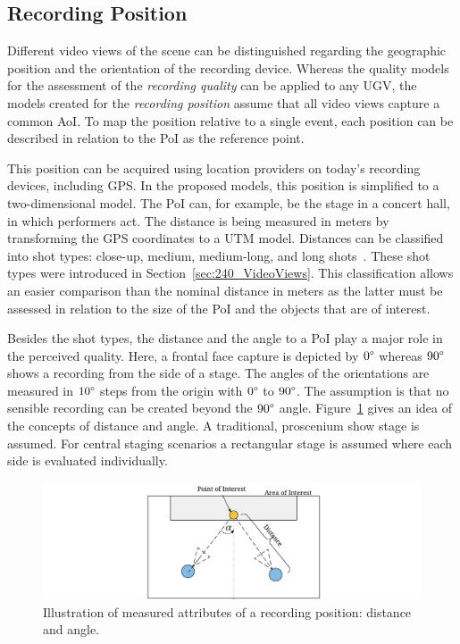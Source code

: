 \subsection{Recording Position}
Different video views of the scene can be distinguished regarding the geographic position and the orientation of the recording device.
Whereas the quality models for the assessment of the \emph{recording quality} can be applied to any \ac{UGV}, the models created for the \emph{recording position} assume that all video views capture a common \ac{AoI}. 
To map the position relative to a single event, each position can be described in relation to the \ac{PoI} as the reference point.

This position can be acquired using location providers on today's recording devices, including \ac{GPS}.
In the proposed models, this position is simplified to a two-dimensional model.
The \ac{PoI} can, for example, be the stage in a concert hall, in which performers act.
The distance is being measured in meters by transforming the \ac{GPS} coordinates to a \ac{UTM} model.
Distances can be classified into shot types: close-up, medium, medium-long, and long shots~\cite{Bowen2013}.
These shot types were introduced in Section~\ref{sec:240_VideoViews}.
This classification allows an easier comparison than the nominal distance in meters as the latter must be assessed in relation to the size of the \ac{PoI} and the objects that are of interest.

Besides the shot types, the distance and the angle to a \ac{PoI} play a major role in the perceived quality.
Here, a frontal face capture is depicted by $0\degree$ whereas $90\degree$ shows a recording from the side of a stage.
The angles of the orientations are measured in $10\degree$ steps from the origin with $0\degree$ to $90\degree$.
The assumption is that no sensible recording can be created beyond the $90\degree$ angle. 
Figure~\ref{fig:420_position_angle} gives an idea of the concepts of distance and angle.
A traditional, proscenium show stage is assumed. 
For central staging scenarios a rectangular stage is assumed where each side is evaluated individually.
\begin{figure}[h!]
	\centering
	\includegraphics[width=\linewidth]{gfx/400_UGV_Quality/position_angle}
	\caption[Illustration on measured attributes of a recording position]{Illustration of measured attributes of a recording position: distance and angle.}
	\label{fig:420_position_angle}
\end{figure}

